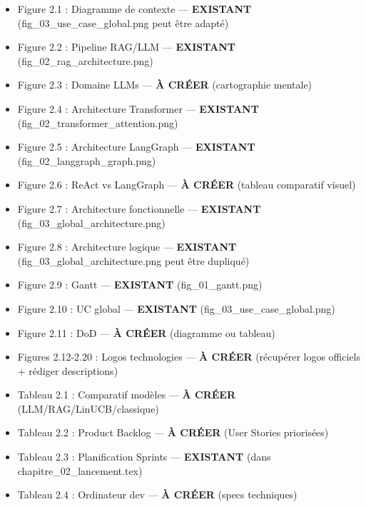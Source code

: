 \documentclass[12pt,a4paper]{article}
\begin{document}
\begin{itemize}
    \item[\textcolor{green}{\checkmark}] Figure 2.1 : Diagramme de contexte — \textbf{EXISTANT} (fig\_03\_use\_case\_global.png peut être adapté)
    \item[\textcolor{green}{\checkmark}] Figure 2.2 : Pipeline RAG/LLM — \textbf{EXISTANT} (fig\_02\_rag\_architecture.png)
    \item[\textcolor{green}{\checkmark}] Figure 2.3 : Domaine LLMs — \textbf{À CRÉER} (cartographie mentale)
    \item[\textcolor{green}{\checkmark}] Figure 2.4 : Architecture Transformer — \textbf{EXISTANT} (fig\_02\_transformer\_attention.png)
    \item[\textcolor{green}{\checkmark}] Figure 2.5 : Architecture LangGraph — \textbf{EXISTANT} (fig\_02\_langgraph\_graph.png)
    \item[\textcolor{green}{\checkmark}] Figure 2.6 : ReAct vs LangGraph — \textbf{À CRÉER} (tableau comparatif visuel)
    \item[\textcolor{green}{\checkmark}] Figure 2.7 : Architecture fonctionnelle — \textbf{EXISTANT} (fig\_03\_global\_architecture.png)
    \item[\textcolor{green}{\checkmark}] Figure 2.8 : Architecture logique — \textbf{EXISTANT} (fig\_03\_global\_architecture.png peut être dupliqué)
    \item[\textcolor{green}{\checkmark}] Figure 2.9 : Gantt — \textbf{EXISTANT} (fig\_01\_gantt.png)
    \item[\textcolor{green}{\checkmark}] Figure 2.10 : UC global — \textbf{EXISTANT} (fig\_03\_use\_case\_global.png)
    \item[\textcolor{green}{\checkmark}] Figure 2.11 : DoD — \textbf{À CRÉER} (diagramme ou tableau)
    \item[\textcolor{orange}{!}] Figures 2.12-2.20 : Logos technologies — \textbf{À CRÉER} (récupérer logos officiels + rédiger descriptions)
    
    \item[\textcolor{green}{\checkmark}] Tableau 2.1 : Comparatif modèles — \textbf{À CRÉER} (LLM/RAG/LinUCB/classique)
    \item[\textcolor{green}{\checkmark}] Tableau 2.2 : Product Backlog — \textbf{À CRÉER} (User Stories priorisées)
    \item[\textcolor{green}{\checkmark}] Tableau 2.3 : Planification Sprints — \textbf{EXISTANT} (dans chapitre\_02\_lancement.tex)
    \item[\textcolor{green}{\checkmark}] Tableau 2.4 : Ordinateur dev — \textbf{À CRÉER} (specs techniques)
\end{itemize}
\end{document}
